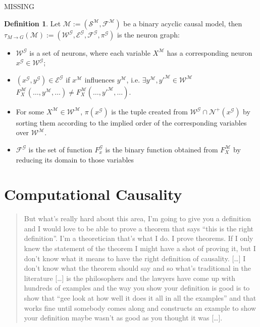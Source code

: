 \documentclass[11pt,a4paper]{book}
\theoremstyle{definition}
\newtheorem{definition}{Definition}[section]
\theoremstyle{definition}
\theoremstyle{definition}
\theoremstyle{remark}
\newcommand{\gtpred}{\mathcal{N}^+}
\newcommand{\ngraph}{\mathcal{G}}
\newcommand{\cmodel}{\mathcal{M}}
\newcommand{\csig}{\mathcal{S}}
\newcommand{\cfoos}{\mathcal{F}}
\newcommand{\cvars}{\mathcal{W}}
\newcommand{\crel}{\mathcal{E}}
\begin{document}
MISSING
\begin{definition}
Let $\cmodel:=(\csig^{\cmodel}, \cfoos^{\cmodel})$ be a binary acyclic causal model, then $\tau_{M\to G}(\cmodel):=(\cvars^{\ngraph}, \crel^{\ngraph}, \cfoos^{\ngraph}, \pi^{\ngraph})$ is the neuron graph:
\begin{itemize}
\item $\cvars^{\ngraph} $ is a set of neurons, where each variable $X^{\cmodel}$ has a corresponding neuron  $x^{\ngraph} \in \cvars^{\ngraph} $;
\item  $(x^{\ngraph}, y^{\ngraph}) \in \crel^{\ngraph}$ if $x^{\cmodel}$ influences $y^{\cmodel}$, i.e. $\exists y^{\cmodel},y'^{\cmodel} \in \cvars^{\cmodel}$ \\
$F_{X}^{\cmodel}(\dots , y^{\cmodel}, \dots ) \neq F_{X}^{\cmodel}(\dots , y'^{\cmodel}, \dots)$.
\item For some $X^{\cmodel} \in \cvars^{\cmodel}$,  $\pi(x^{\ngraph})$ is the tuple created from $\cvars^{\ngraph} \cap \gtpred(x^{\ngraph})$ by sorting them according to the implied order of the corresponding variables over $\cvars^{\cmodel}$.
\item $\cfoos^{\ngraph}$ is the set of function $F_x^{\ngraph}$ is the binary function obtained from $F_X^{\cmodel}$ by reducing its domain to those variables 
\end{itemize}
\end{definition}



\chapter{Computational Causality}
\label{ch:comp_causality}
\begin{quote}
But what's really hard about this area, I'm going to give you a definition and I would love to be able to prove a theorem that says ``this is the right definition''. I'm a theoretician that's what I do. I prove theorems. If I only knew the statement of the theorem I might have a shot of proving it, but I don't know what it means to have the right definition of causality. [\dots] I don't know what the theorem should say and so what's traditional in the literature [\dots]
is the philosophers and the lawyers have come up with hundreds of examples and the way you show your definition is good is to show that ``gee look at how well it does it all in all the examples'' and that works fine until somebody comes along and constructs an example to show your definition maybe wasn't as good as you thought it was [\dots].
\end{quote}
\end{document}
